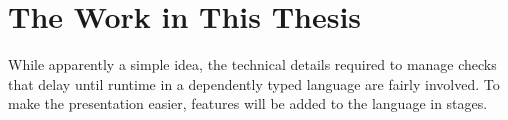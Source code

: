 \section{The Work in This Thesis}





While apparently a simple idea, the technical details required to manage checks that delay until runtime in a dependently typed language are fairly involved.
To make the presentation easier, features will be added to the language in stages.

